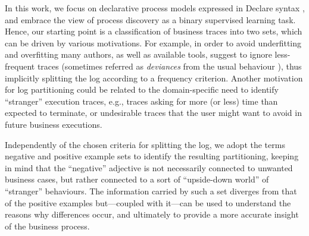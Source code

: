 In this work, we focus on declarative process models expressed in Declare syntax \cite{2008-Pesic}, and embrace the view of process discovery as a binary supervised learning task. Hence, our starting point is a classification of business traces into two sets, which can be driven by various motivations.
For example, in order to avoid underfitting and overfitting \cite{2010-Aalst} many authors, as well as available tools, suggest to ignore less-frequent traces (sometimes referred as \emph{deviances} from the usual behaviour \cite{2016-Nguyen}), thus implicitly splitting the log according to a frequency criterion. Another motivation for log partitioning could be related to the domain-specific need to identify ``stranger'' execution traces, e.g., traces asking for more (or less) time than expected to terminate, or undesirable traces that the user might want to avoid in future business executions.


%
Independently of the chosen criteria for splitting the log, we adopt the terms negative and positive example sets to identify the resulting partitioning, keeping in mind that the ``negative'' adjective is not necessarily connected to unwanted business cases, but rather connected to a sort of ``upside-down world'' of ``stranger'' behaviours. The information carried by such a set diverges from that of the positive examples but---coupled with it---can be used to understand the reasons why differences occur, and ultimately to provide a more accurate insight of the business process. 


